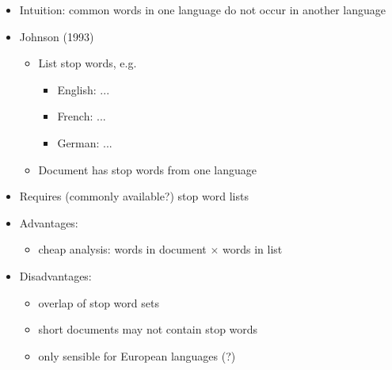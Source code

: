 \documentclass[a4paper,landscape,headrule,footrule,xetex]{foils}
\begin{document}
\begin{itemize}
\item Intuition: common words in one language do not occur in another language
\item Johnson (1993)
\begin{itemize}
\item List stop words, e.g.\ 
\begin{itemize}
\item English: ...
\item French: ...
\item German: ...
\end{itemize}
\item Document has stop words from one language
\end{itemize}
\item Requires (commonly available?) stop word lists
\pagebreak
\item Advantages:
  \begin{itemize}
  \item cheap analysis: words in document $\times$ words in list
  \end{itemize}
\item Disadvantages:
  \begin{itemize}
  \item overlap of stop word sets
  \item short documents may not contain stop words
  \item only sensible for European languages (?)
  \end{itemize}
\end{itemize}











\end{document}
